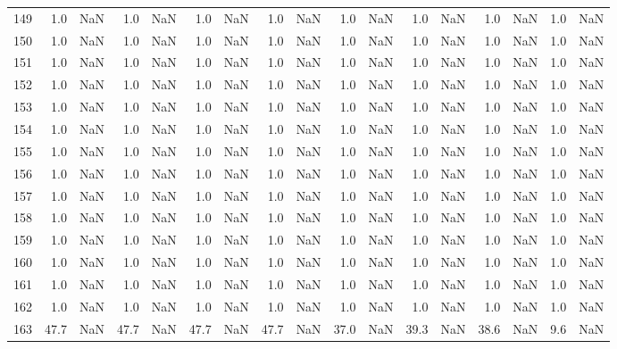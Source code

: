 \begin{tabular}{lrrrrrrrrrrrrrrrr}
    149 &  1.0 & NaN &   1.0 &   NaN &   1.0 &   NaN &   1.0 &   NaN &   1.0 &   NaN &   1.0 &   NaN &   1.0 &   NaN &   1.0 &   NaN \\
    150 &  1.0 & NaN &   1.0 &   NaN &   1.0 &   NaN &   1.0 &   NaN &   1.0 &   NaN &   1.0 &   NaN &   1.0 &   NaN &   1.0 &   NaN \\
    151 &  1.0 & NaN &   1.0 &   NaN &   1.0 &   NaN &   1.0 &   NaN &   1.0 &   NaN &   1.0 &   NaN &   1.0 &   NaN &   1.0 &   NaN \\
    152 &  1.0 & NaN &   1.0 &   NaN &   1.0 &   NaN &   1.0 &   NaN &   1.0 &   NaN &   1.0 &   NaN &   1.0 &   NaN &   1.0 &   NaN \\
    153 &  1.0 & NaN &   1.0 &   NaN &   1.0 &   NaN &   1.0 &   NaN &   1.0 &   NaN &   1.0 &   NaN &   1.0 &   NaN &   1.0 &   NaN \\
    154 &  1.0 & NaN &   1.0 &   NaN &   1.0 &   NaN &   1.0 &   NaN &   1.0 &   NaN &   1.0 &   NaN &   1.0 &   NaN &   1.0 &   NaN \\
    155 &  1.0 & NaN &   1.0 &   NaN &   1.0 &   NaN &   1.0 &   NaN &   1.0 &   NaN &   1.0 &   NaN &   1.0 &   NaN &   1.0 &   NaN \\
    156 &  1.0 & NaN &   1.0 &   NaN &   1.0 &   NaN &   1.0 &   NaN &   1.0 &   NaN &   1.0 &   NaN &   1.0 &   NaN &   1.0 &   NaN \\
    157 &  1.0 & NaN &   1.0 &   NaN &   1.0 &   NaN &   1.0 &   NaN &   1.0 &   NaN &   1.0 &   NaN &   1.0 &   NaN &   1.0 &   NaN \\
    158 &  1.0 & NaN &   1.0 &   NaN &   1.0 &   NaN &   1.0 &   NaN &   1.0 &   NaN &   1.0 &   NaN &   1.0 &   NaN &   1.0 &   NaN \\
    159 &  1.0 & NaN &   1.0 &   NaN &   1.0 &   NaN &   1.0 &   NaN &   1.0 &   NaN &   1.0 &   NaN &   1.0 &   NaN &   1.0 &   NaN \\
    160 &  1.0 & NaN &   1.0 &   NaN &   1.0 &   NaN &   1.0 &   NaN &   1.0 &   NaN &   1.0 &   NaN &   1.0 &   NaN &   1.0 &   NaN \\
    161 &  1.0 & NaN &   1.0 &   NaN &   1.0 &   NaN &   1.0 &   NaN &   1.0 &   NaN &   1.0 &   NaN &   1.0 &   NaN &   1.0 &   NaN \\
    162 &  1.0 & NaN &   1.0 &   NaN &   1.0 &   NaN &   1.0 &   NaN &   1.0 &   NaN &   1.0 &   NaN &   1.0 &   NaN &   1.0 &   NaN \\
    163 & 47.7 & NaN &  47.7 &   NaN &  47.7 &   NaN &  47.7 &   NaN &  37.0 &   NaN &  39.3 &   NaN &  38.6 &   NaN &   9.6 &   NaN \\

\end{tabular}
